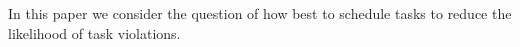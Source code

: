 
In this paper we consider the question of how best to schedule tasks to reduce the likelihood of task violations.